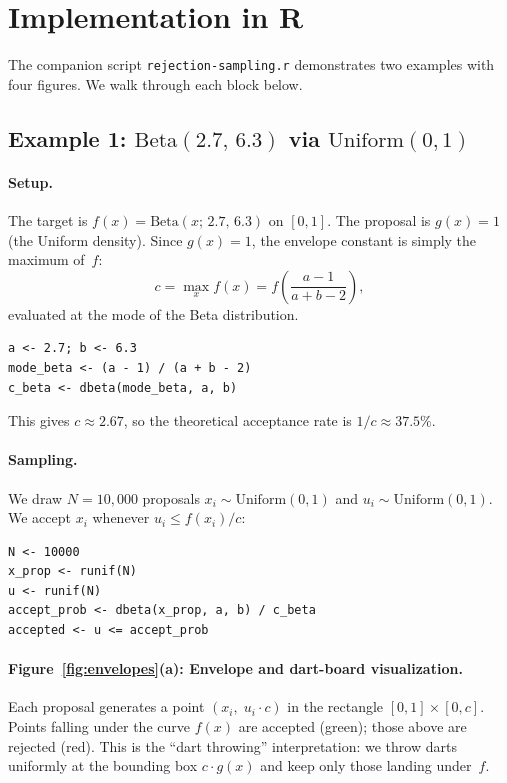 \documentclass[11pt]{article}
\newcommand{\R}{\textsf{R}}
\begin{document}
\section{Implementation in \R}

The companion script \texttt{rejection-sampling.r} demonstrates two examples with four figures.  We walk through each block below.

\subsection{Example 1: $\mathrm{Beta}(2.7,\, 6.3)$ via $\mathrm{Uniform}(0,1)$}

\paragraph{Setup.}
The target is $f(x) = \mathrm{Beta}(x;\,2.7,\,6.3)$ on $[0,1]$.  The proposal is $g(x) = 1$ (the Uniform density).  Since $g(x)=1$, the envelope constant is simply the maximum of~$f$:
\[
  c = \max_{x} f(x) = f\!\left(\frac{a-1}{a+b-2}\right),
\]
evaluated at the mode of the Beta distribution.

\begin{lstlisting}
a <- 2.7; b <- 6.3
mode_beta <- (a - 1) / (a + b - 2)
c_beta <- dbeta(mode_beta, a, b)
\end{lstlisting}

This gives $c \approx 2.67$, so the theoretical acceptance rate is $1/c \approx 37.5\%$.

\paragraph{Sampling.}
We draw $N = 10{,}000$ proposals $x_i \sim \mathrm{Uniform}(0,1)$ and $u_i \sim \mathrm{Uniform}(0,1)$.  We accept $x_i$ whenever $u_i \le f(x_i)/c$:

\begin{lstlisting}
N <- 10000
x_prop <- runif(N)
u <- runif(N)
accept_prob <- dbeta(x_prop, a, b) / c_beta
accepted <- u <= accept_prob
\end{lstlisting}

\paragraph{Figure~\ref{fig:envelopes}(a): Envelope and dart-board visualization.}
Each proposal generates a point $(x_i,\; u_i \cdot c)$ in the rectangle $[0,1]\times[0,c]$.  Points falling under the curve $f(x)$ are accepted (green); those above are rejected (red).  This is the ``dart throwing'' interpretation: we throw darts uniformly at the bounding box $c \cdot g(x)$ and keep only those landing under~$f$.
\end{document}
